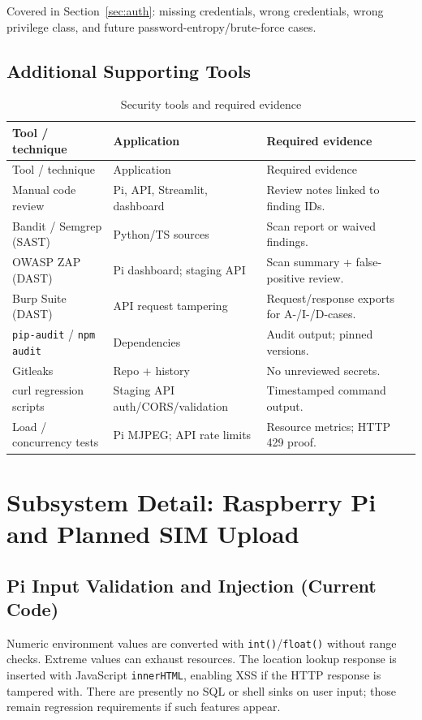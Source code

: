 \documentclass[12pt]{article}
\newcommand{\toprule}{\hline}
\newcommand{\midrule}{\hline}
\newcommand{\bottomrule}{\hline}
\begin{document}
Covered in Section~\ref{sec:auth}: missing credentials, wrong credentials, wrong
privilege class, and future password-entropy/brute-force cases.

\subsection{Additional Supporting Tools}

\begin{longtable}{p{}p{}p{}}
\caption{Security tools and required evidence}\label{tab:tools}\\
\toprule
Tool / technique & Application & Required evidence \\
\midrule
\endfirsthead
\toprule
Tool / technique & Application & Required evidence \\
\midrule
\endhead
Manual code review & Pi, API, Streamlit, dashboard & Review notes linked to finding IDs. \\
Bandit / Semgrep (SAST) & Python/TS sources & Scan report or waived findings. \\
OWASP ZAP (DAST) & Pi dashboard; staging API & Scan summary + false-positive review. \\
Burp Suite (DAST) & API request tampering & Request/response exports for A-/I-/D-cases. \\
\texttt{pip-audit} / \texttt{npm audit} & Dependencies & Audit output; pinned versions. \\
Gitleaks & Repo + history & No unreviewed secrets. \\
curl regression scripts & Staging API auth/CORS/validation & Timestamped command output. \\
Load / concurrency tests & Pi MJPEG; API rate limits & Resource metrics; HTTP 429 proof. \\
\bottomrule
\end{longtable}

\section{Subsystem Detail: Raspberry Pi and Planned SIM Upload}
\label{sec:pi}

\subsection{Pi Input Validation and Injection (Current Code)}

Numeric environment values are converted with \texttt{int()}/\texttt{float()}
without range checks. Extreme values can exhaust resources. The location lookup
response is inserted with JavaScript \texttt{innerHTML}, enabling XSS if the
HTTP response is tampered with. There are presently no SQL or shell sinks on
user input; those remain regression requirements if such features appear.
\end{document}
